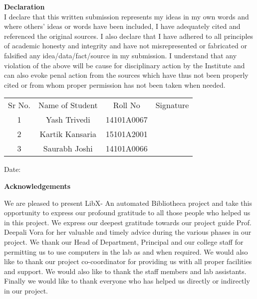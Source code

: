 \documentclass[a4paper,12pt]{report}
\begin{document}
\begin{center}
\vspace*{0.25cm}
    {\centering
    {\large\textbf{Declaration}}\\
    \justify
    I declare that this written submission represents my ideas in my own words and where others' ideas or words have been included, I have adequately cited and referenced the original sources. I also declare that I have adhered to all principles of academic honesty and integrity and have not misrepresented or fabricated or falsified any idea/data/fact/source in my submission. I understand that any violation of the above will be cause for disciplinary action by the Institute and can also evoke penal action from the sources which have thus not been properly cited or from whom proper permission has not been taken when needed.\\

\vspace{0.5cm}
\begin{table}[h!]
\centering
\begin{tabular}{c   c   c   c}

  Sr No.   & Name of Student   & Roll No   & Signature \\

  1 &  Yash Trivedi  & 14101A0067   &    \\

  2 &  Kartik Kansaria  & 15101A2001  &  \\

  3 &  Saurabh Joshi  & 14101A0066   &   \\


\end{tabular}
\end{table}

\vspace{3cm}

\flushleft Date:\\
    }
\end{center}

\pagebreak
\begin{center}
\vspace*{0.25cm}
    {\centering
    {\large\textbf{Acknowledgements}}\\
    }
\end{center}
\par \justify We are pleased to present LibX- An automated Bibliotheca project and take this opportunity to express our profound gratitude to all those people who helped us in this project. We express our deepest gratitude towards our project guide Prof. Deepali Vora for her valuable and timely advice during the various phases in our project. We thank our Head of Department, Principal and our college staff for permitting us to use computers in the lab as and when required. We would also like to thank our project co-coordinator for providing us with all proper facilities and support. We would also like to thank the staff members and lab assistants. Finally we would like to thank everyone who has helped us directly or indirectly in our project.
\\
\end{document}

